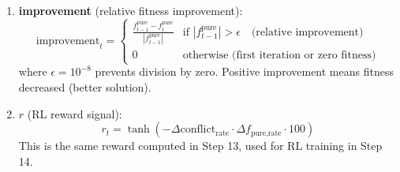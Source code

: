 \documentclass[11pt,a4paper]{article}
\begin{document}
\begin{itemize}
\begin{enumerate}
\begin{itemize}
        \item \textbf{Why they differ:}
        \begin{itemize}
            \item During optimization (Step 1), each agent evaluates penalty term for \textbf{many particles} ($M=300$ particles)
            \item In output (Step 15), we report penalty value for the \textbf{single consensus solution} $x_{i,\text{con}}$
            \item At convergence: Both penalty term and penalty value approach zero as $\text{conflict}_i \to 0$
        \end{itemize}
        
        \item         \textbf{Numerical example:}
        \begin{itemize}
            \item Agent 1: $\alpha_1 = 0.002$, $\text{conflict}_1(x_{1,\text{con}}) = 0.05$ $\Rightarrow$ penalty term $= 0.002 \times 0.05 = 0.0001$
            \item Agent 2: $\alpha_2 = 0.002$, $\text{conflict}_2(x_{2,\text{con}}) = 0.03$ $\Rightarrow$ penalty term $= 0.002 \times 0.03 = 0.00006$
            \item Penalty value (output) $= \frac{1}{2}(0.0001 + 0.00006) = 0.00008$
        \end{itemize}
    \end{itemize}
    
    \item \textbf{improvement} (relative fitness improvement):
    \begin{equation}
    \text{improvement}_t = \begin{cases}
    \frac{f_{t-1}^{\text{pure}} - f_t^{\text{pure}}}{|f_{t-1}^{\text{pure}}|} & \text{if } |f_{t-1}^{\text{pure}}| > \epsilon \quad \text{(relative improvement)} \\
    0 & \text{otherwise (first iteration or zero fitness)}
    \end{cases}
    \end{equation}
    where $\epsilon = 10^{-8}$ prevents division by zero. Positive improvement means fitness decreased (better solution).
    
    \item \textbf{$r$} (RL reward signal):
    \begin{equation}
    r_t = \tanh\!\left(-\Delta\text{conflict}_{\text{rate}} \cdot \Delta f_{\text{pure,rate}} \cdot 100\right)
    \end{equation}
    This is the same reward computed in Step 13, used for RL training in Step 14.
    

\end{enumerate}
\end{itemize}
\end{document}
